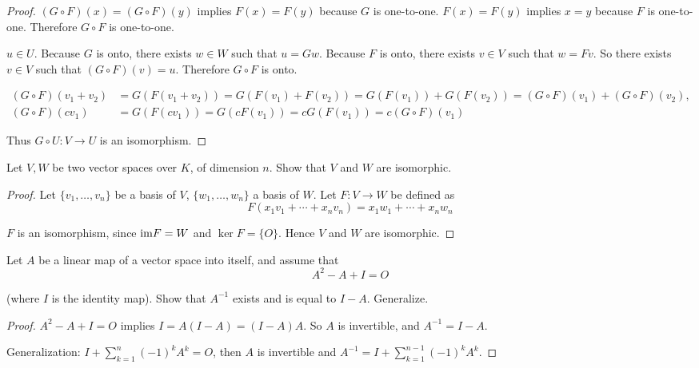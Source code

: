 \begin{proof}
    $(G\circ F)(x) = (G\circ F)(y)$ implies $F(x) = F(y)$ because $G$ is one-to-one. $F(x) = F(y)$ implies $x = y$ because $F$ is one-to-one. Therefore $G\circ F$ is one-to-one.

    $u\in U$. Because $G$ is onto, there exists $w\in W$ such that $u = Gw$. Because $F$ is onto, there exists $v\in V$ such that $w = Fv$. So there exists $v\in V$ such that $(G\circ F)(v) = u$. Therefore $G\circ F$ is onto.

    \begin{align*}
        (G\circ F)(v_{1} + v_{2}) & = G(F(v_{1} + v_{2})) = G(F(v_{1}) + F(v_{2})) = G(F(v_{1})) + G(F(v_{2})) = (G\circ F)(v_{1}) + (G\circ F)(v_{2}), \\
        (G\circ F)(cv_{1})        & = G(F(cv_{1})) = G(cF(v_{1})) = cG(F(v_{1})) = c(G\circ F)(v_{1})
    \end{align*}

    Thus $G\circ U: V\to U$ is an isomorphism.
\end{proof}

\begin{exercise}
    Let $V, W$ be two vector spaces over $K$, of dimension $n$. Show that $V$ and $W$ are isomorphic.
\end{exercise}

\begin{proof}
    Let $\{ v_{1}, \ldots, v_{n} \}$ be a basis of $V$, $\{ w_{1}, \ldots, w_{n} \}$ a basis of $W$. Let $F: V\to W$ be defined as
    \[
        F(x_{1}v_{1} + \cdots + x_{n}v_{n}) = x_{1}w_{1} + \cdots + x_{n}w_{n}
    \]

    $F$ is an isomorphism, since $\text{im} F = W$ and $\ker F = \{ O \}$. Hence $V$ and $W$ are isomorphic.
\end{proof}

\begin{exercise}
    Let $A$ be a linear map of a vector space into itself, and assume that
    \[
        A^{2} - A + I = O
    \]

    (where $I$ is the identity map). Show that $A^{-1}$ exists and is equal to $I - A$. Generalize.
\end{exercise}

\begin{proof}
    $A^{2} - A + I = O$ implies $I = A(I - A) = (I - A)A$. So $A$ is invertible, and $A^{-1} = I - A$.

    Generalization: $I + \sum^{n}_{k=1}{(-1)}^{k}A^{k} = O$, then $A$ is invertible and $A^{-1} = I + \sum^{n-1}_{k=1}{(-1)}^{k}A^{k}$.
\end{proof}

